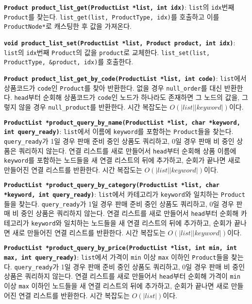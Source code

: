 \documentclass[runningheads]{llncs}
\begin{document}
\textbf{\texttt{Product product_list_get(ProductList *list, int idx)}}: \texttt{list}의 \texttt{idx}번째 \texttt{Product}를 찾는다. \texttt{list_get(list, ProductType, idx)}를 호출하고 이를 \texttt{ProductNode*}로 캐스팅한 후 값을 가져온다.

\textbf{\texttt{void product_list_set(ProductList *list, Product product, int idx)}}: \texttt{list}의 \texttt{idx}번째 \texttt{Product}의 값을 \texttt{product}로 교체한다. \texttt{list_set(list, ProductType, \&product, idx)}를 호출한다.

\textbf{\texttt{Product product_list_get_by_code(ProductList *list, int code)}}: \texttt{list}에서 상품코드가 \texttt{code}인 \texttt{Product}를 찾아 반환한다. 없을 경우 \texttt{null_order}를 대신 반환한다. \texttt{head}부터 순회해 상품코드가 \texttt{code}인 노드가 하나라도 존재하면 그 노드의 값을, 그렇지 않을 경우 \texttt{null_product}를 반환한다. 시간 복잡도는 $O(\left|list\right|\left|keyword\right|)$이다.

\textbf{\texttt{ProductList *product_query_by_name(ProductList *list, char *keyword, int query_ready)}}: \texttt{list}에서 이름에 \texttt{keyword}를 포함하는 \texttt{Product}들을 찾는다. \texttt{query_ready}가 1일 경우 판매 준비 중인 상품도 쿼리하고, 0일 경우 판매 비 중인 상품은 쿼리하지 않는다. 연결 리스트를 새로 만들어서 \texttt{head}부터 순회해 상품 이름에 \texttt{keyword}를 포함하는 노드들을 새 연결 리스트의 뒤에 추가하고, 순회가 끝나면 새로 만들어진 연결 리스트를 반환한다. 시간 복잡도는 $O(\left|list\right|\left|keyword\right|)$이다.

\textbf{\texttt{ProductList *product_query_by_category(ProductList *list, char *keyword, int query_ready)}}: \texttt{list}에서 카테고리가 \texttt{keyword}와 일치하는 \texttt{Product}들을 찾는다. \texttt{query_ready}가 1일 경우 판매 준비 중인 상품도 쿼리하고, 0일 경우 판매 비 중인 상품은 쿼리하지 않는다. 연결 리스트를 새로 만들어서 \texttt{head}부터 순회해 카테고리가 \texttt{keyword}와 일치하는 노드들을 새 연결 리스트의 뒤에 추가하고, 순회가 끝나면 새로 만들어진 연결 리스트를 반환한다. 시간 복잡도는 $O(\left|list\right|\left|keyword\right|)$이다.

\textbf{\texttt{ProductList *product_query_by_price(ProductList *list, int min, int max, int query_ready)}}: \texttt{list}에서 가격이 \texttt{min} 이상 \texttt{max} 이하인 \texttt{Product}들을 찾는다. \texttt{query_ready}가 1일 경우 판매 준비 중인 상품도 쿼리하고, 0일 경우 판매 비 중인 상품은 쿼리하지 않는다. 연결 리스트를 새로 만들어서 \texttt{head}부터 순회해 가격이 \texttt{min} 이상 \texttt{max} 이하인 노드들을 새 연결 리스트의 뒤에 추가하고, 순회가 끝나면 새로 만들어진 연결 리스트를 반환한다. 시간 복잡도는 $O(\left|list\right|)$이다.
\end{document}
